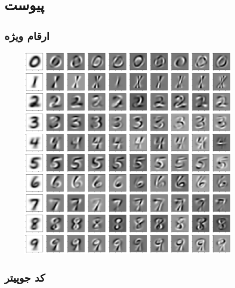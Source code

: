 	\section{پیوست}

	\subsection{ارقام ویژه}
	\label{sec:eigen_digits}
	\begin{figure}[h]
		\centering
		\includegraphics[width=\linewidth]{assets/PCA.png}
	\end{figure}
	
	

	\subsection{کد جوپیتر}
	
